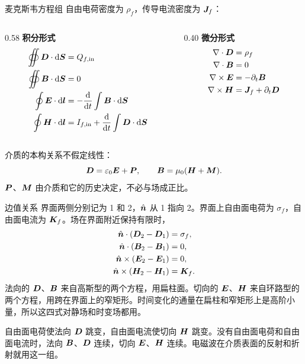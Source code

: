 \begin{frame}{麦克斯韦方程组}
自由电荷密度为 $\rho_f$，传导电流密度为 $\bm{J}_f$：
\begin{columns}[T,onlytextwidth]
\begin{column}{0.58\textwidth}
\textbf{积分形式}
\[
 \begin{aligned}
 \oiint\vct D\cdot\dd\vct S&=Q_{f,{\rm in}}\\
 \oiint\vct B\cdot\dd\vct S&=0\\
 \oint\vct E\cdot\dd\vct l
 &=-\frac{\dd}{\dd t}\int\vct B\cdot\dd\vct S\\
 \oint\vct H\cdot\dd\vct l
 &=I_{f,{\rm in}}+\frac{\dd}{\dd t}\int\vct D\cdot\dd\vct S
 \end{aligned}
\]
\end{column}
\begin{column}{0.40\textwidth}
\textbf{微分形式}
\[
 \begin{aligned}
 \nabla\cdot\bm{D}&=\rho_f\\
 \nabla\cdot\bm{B}&=0\\
 \nabla\times\bm{E}&=-\partial_t\bm{B}\\
 \nabla\times\bm{H}
 &=\bm{J}_f+\partial_t\bm{D}
 \end{aligned}
\]
\end{column}
\end{columns}
介质的本构关系不假定线性：
\[
 \bm{D}=\varepsilon_0\bm{E}+\bm{P},\qquad
 \bm{B}=\mu_0(\bm{H}+\bm{M}).
\]
$\bm{P}$、$\bm{M}$ 由介质和它的历史决定，不必与场成正比。
\end{frame}

\begin{frame}{边值关系}
界面两侧分别记为 1 和 2，$\hat{\bm{n}}$ 从 1 指向 2。界面上自由面电荷为 $\sigma_f$，自由面电流为 $\bm{K}_f$。场在界面附近保持有限时，
\[
 \begin{aligned}
 \hat{\bm{n}}\cdot(\bm{D}_2-\bm{D}_1)&=\sigma_f,\\
 \hat{\bm{n}}\cdot(\bm{B}_2-\bm{B}_1)&=0,\\
 \hat{\bm{n}}\times(\bm{E}_2-\bm{E}_1)&=0,\\
 \hat{\bm{n}}\times(\bm{H}_2-\bm{H}_1)&=\bm{K}_f.
 \end{aligned}
\]
法向的 $\bm{D}$、$\bm{B}$ 来自高斯型的两个方程，用扁柱面。切向的 $\bm{E}$、$\bm{H}$ 来自环路型的两个方程，用跨在界面上的窄矩形。时间变化的通量在扁柱和窄矩形上是高阶小量，所以这四式对静场和时变场都用。

自由面电荷使法向 $\bm{D}$ 跳变，自由面电流使切向 $\bm{H}$ 跳变。没有自由面电荷和自由面电流时，法向 $\bm{B}$、$\bm{D}$ 连续，切向 $\bm{E}$、$\bm{H}$ 连续。电磁波在介质表面的反射和折射就用这一组。
\end{frame}

